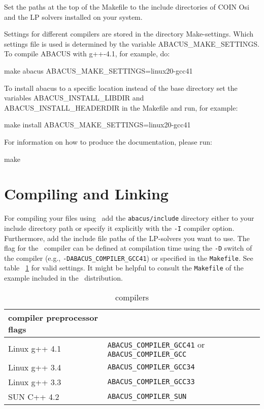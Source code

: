 Set the paths at the top of the Makefile to the include directories
of COIN Osi and the LP solvers installed on your system.

Settings for different compilers are stored in the directory Make-settings.
Which settings file is used is determined by the variable ABACUS\_MAKE\_SETTINGS.
To compile ABACUS with g++-4.1, for example, do:

make abacus ABACUS\_MAKE\_SETTINGS=linux20-gcc41

To install abacus to a specific location instead of the base directory
set the variables ABACUS\_INSTALL\_LIBDIR and ABACUS\_INSTALL\_HEADERDIR in
the Makefile and run, for example:

make install ABACUS\_MAKE\_SETTINGS=linux20-gcc41

For information on how to produce the documentation, please run:

make


\section{Compiling and Linking}
\label{section:CompilingAndLinking}

For compiling your files using \ABACUS\  add
the {\tt abacus/include} directory either to your include directory
path or specify it explicitly with the {\tt -I} compiler option.
Furthermore, add the include file paths of the LP-solvers you want to use.
The flag for the \CPLUSPLUS\ compiler can be defined at compilation time using 
the {\tt -D} switch of the compiler (e.g., {\tt -DABACUS\_COMPILER\_GCC41})
or specified in the {\tt Makefile}. See table ~\ref{table:compilers} for valid 
settings.
It might be helpful to consult the {\tt Makefile} of the example
included in the \ABACUS\ distribution.

\begin{table}[htp]
\begin{center}
\begin{tabular}{|l|l|}
\hline
compiler preprocessor flags\\
\hline
Linux g++  4.1 & {\tt ABACUS\_COMPILER\_GCC41} or {\tt ABACUS\_COMPILER\_GCC} \\
Linux g++  3.4 & {\tt ABACUS\_COMPILER\_GCC34} \\
Linux g++  3.3 & {\tt ABACUS\_COMPILER\_GCC33} \\
SUN C++ 4.2 & {\tt ABACUS\_COMPILER\_SUN} \\
\hline
\end{tabular}
\caption{compilers}
\label{table:compilers}
\end{center}
\end{table}     

